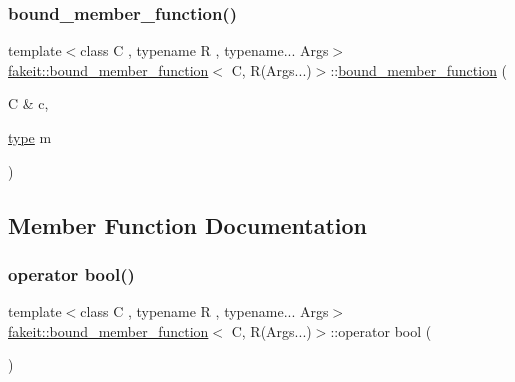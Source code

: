 \mbox{\label{classfakeit_1_1bound__member__function_3_01C_00_01R_07Args_8_8_8_08_4_a96b71d3d4beae9d121f85cd73d541c59}} 
\subsubsection{\texorpdfstring{bound\_member\_function()}{bound\_member\_function()}\hspace{0.1cm}{\footnotesize\ttfamily [2/2]}}
{\footnotesize\ttfamily template$<$class C , typename R , typename... Args$>$ \\
\mbox{\hyperlink{classfakeit_1_1bound__member__function}{fakeit\+::bound\+\_\+member\+\_\+function}}$<$ C, R(Args...)$>$\+::\mbox{\hyperlink{classfakeit_1_1bound__member__function}{bound\+\_\+member\+\_\+function}} (\begin{DoxyParamCaption}\item[{C \&}]{c,  }\item[{\mbox{\hyperlink{classfakeit_1_1bound__member__function_3_01C_00_01R_07Args_8_8_8_08_4_ac79ac3937ebd63418a5873c044c22cf9}{type}}}]{m }\end{DoxyParamCaption})\hspace{0.3cm}{\ttfamily [inline]}}



\subsection{Member Function Documentation}
\mbox{\label{classfakeit_1_1bound__member__function_3_01C_00_01R_07Args_8_8_8_08_4_a2d60df3ab6ccf7d9d16d9756153d2528}} 
\subsubsection{\texorpdfstring{operator bool()}{operator bool()}}
{\footnotesize\ttfamily template$<$class C , typename R , typename... Args$>$ \\
\mbox{\hyperlink{classfakeit_1_1bound__member__function}{fakeit\+::bound\+\_\+member\+\_\+function}}$<$ C, R(Args...)$>$\+::operator bool (\begin{DoxyParamCaption}{ }\end{DoxyParamCaption})\hspace{0.3cm}{\ttfamily [inline]}}

